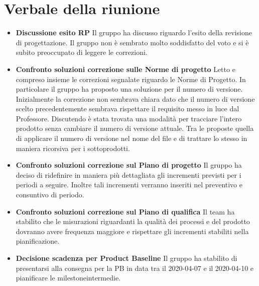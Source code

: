\section{Verbale della riunione}
	\begin{itemize}
	\item \textbf{Discussione esito RP}
	Il gruppo ha discusso riguardo l'esito della revisione di progettazione. Il gruppo non è sembrato molto soddisfatto del voto e si è subito preoccupato di leggere le correzioni.
	\item \textbf{Confronto soluzioni correzione sulle Norme di progetto}
	Letto e compreso insieme le correzioni segnalate riguardo le Norme di Progetto. In particolare il gruppo ha proposto una soluzione per il numero di versione. Inizialmente la correzione non sembrava chiara dato che il numero di versione scelto precedentemente sembrava rispettare il requisito messo in luce dal Professore. Discutendo è stata trovata una modalità per tracciare l'intero prodotto senza cambiare il numero di versione attuale. Tra le proposte quella di applicare il numero di versione nel nome del file e di trattare lo stesso in maniera ricorsiva per i sottoprodotti.
	\item \textbf{Confronto soluzioni correzione sul Piano di progetto}
	Il gruppo ha deciso di ridefinire in maniera più dettagliata gli incrementi previsti per i periodi a seguire. Inoltre tali incrementi verranno inseriti nel preventivo e consuntivo di periodo.
	\item \textbf{Confronto soluzioni correzione sul Piano di qualifica}
	Il team ha stabilito che le misurazioni riguardanti la qualità dei processi e del prodotto dovranno avere frequenza maggiore e rispettare gli incrementi stabiliti nella pianificazione.
	\item \textbf{Decisione scadenza per Product Baseline}
	Il gruppo ha stabilito di presentarsi alla consegna per la PB in data tra il 2020-04-07 e il 2020-04-10 e pianificare le milestone\glo intermedie.
	\end{itemize}
